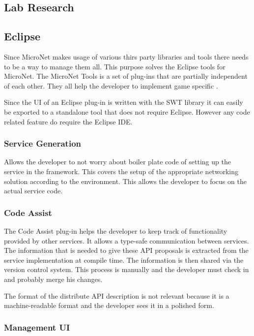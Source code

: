 \subsection{Lab Research}

\subsection{Eclipse}

Since MicroNet makes usage of various thirs party libraries and tools there
needs to be a way to manage them all. This purpose solves the Eclipse tools for
MicroNet. The MicroNet Tools is a set of plug-ins that are partially independent
of each other. They all help the developer to implement game specific \mss{}.

Since the UI of an Eclipse plug-in is written with the SWT library it can easily
be exported to a standalone tool that does not require Eclipse. However any code
related feature do require the Eclipse IDE.

\subsubsection{Service Generation}

Allows the developer to not worry about boiler plate code of setting up the
service in the framework. This covers the setup of the appropriate networking
solution according to the environment. This allows the developer to focus on the
actual service code.

\subsubsection{Code Assist}

The Code Assist plug-in helps the developer to keep track of functionality
provided by other services. It allows a type-safe communication between
services. The information that is needed to give these API proposals is
extracted from the service implementation at compile time. The information is
then shared via the version control system. This process is manually and the
developer must check in and probably merge his changes. 

The format of the distribute API description is not relevant because it is a
machine-readable format and the developer sees it in a polished form.

\subsubsection{Management UI}

